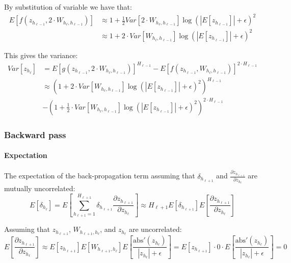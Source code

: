 By substitution of variable we have that:
\begin{equation}
\begin{aligned}
E\left[f(z_{h_{\ell-1}}, 2 \cdot W_{h_{\ell}, h_{\ell-1}})\right] &\approx 1 + \frac{1}{2} Var[2 \cdot W_{h_{\ell}, h_{\ell-1}}] \log(|E[z_{h_{\ell-1}}]| + \epsilon)^2 \\
&\approx 1 + 2 \cdot Var[W_{h_{\ell}, h_{\ell-1}}] \log(|E[z_{h_{\ell-1}}]| + \epsilon)^2
\end{aligned}
\end{equation}

This gives the variance:
\begin{equation}
\begin{aligned}
Var[z_{h_\ell}] &= E\left[g(z_{h_{\ell-1}}, 2 \cdot W_{h_{\ell}, h_{\ell-1}}) \right]^{H_{\ell-1}}
- E\left[f(z_{h_{\ell-1}}, W_{h_{\ell}, h_{\ell-1}})\right]^{2\cdot H_{\ell-1}} \\
&\approx \left(1 + 2 \cdot Var[W_{h_{\ell}, h_{\ell-1}}] \log(|E[z_{h_{\ell-1}}]| + \epsilon)^2\right)^{H_{\ell-1}} \\
&- \left(1 + \frac{1}{2} \cdot Var[W_{h_{\ell}, h_{\ell-1}}] \log(|E[z_{h_{\ell-1}}]| + \epsilon)^2\right)^{2\cdot H_{\ell-1}}
\end{aligned}
\end{equation}

\subsubsection{Backward pass}

\paragraph{Expectation} The expectation of the back-propagation term assuming that $\delta_{h_{\ell+1}}$ and $\frac{\partial z_{h_{\ell+1}}}{\partial z_{h_\ell}}$ are mutually uncorrelated:
\begin{equation}
E[\delta_{h_\ell}] = E\left[\sum_{h_{\ell+1}=1}^{H_{\ell+1}} \delta_{h_{\ell+1}} \frac{\partial z_{h_{\ell+1}}}{\partial z_{h_\ell}}\right] \approx H_{\ell+1} E[\delta_{h_{\ell+1}}] E\left[\frac{\partial z_{h_{\ell+1}}}{\partial z_{h_\ell}}\right]
\end{equation}

Assuming that $z_{h_{\ell+1}}$, $W_{h_{\ell+1},h_\ell}$, and $z_{h_\ell}$ are uncorrelated:
\begin{equation}
E\left[\frac{\partial z_{h_{\ell+1}}}{\partial z_{h_\ell}}\right] \approx E[{z_{h_{\ell+1}}}] E[W_{h_{\ell+1}, h_{\ell}}] E\left[ \frac{\mathrm{abs}'(z_{h_{\ell}})}{|z_{h_{\ell}}| + \epsilon}\right] = E[z_{h_{\ell+1}}] \cdot 0 \cdot E\left[ \frac{\mathrm{abs}'(z_{h_{\ell}})}{|z_{h_\ell}| + \epsilon}\right] = 0
\end{equation}


